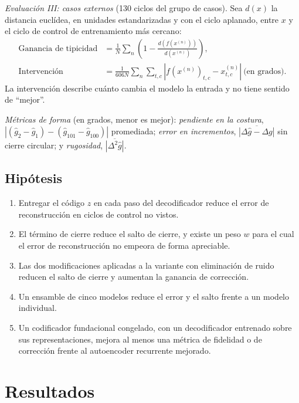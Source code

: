 \documentclass[11pt,a4paper]{amsart}
\begin{document}
\textit{Evaluación III: casos externos} (130 ciclos del grupo de casos). Sea $d(x)$ la distancia euclídea, en unidades estandarizadas y con el ciclo aplanado, entre $x$ y el ciclo de control de entrenamiento más cercano:
\begin{align}
\text{Ganancia de tipicidad}&=\frac1N\sum_{n}\left(1-\frac{d(f(x^{(n)}))}{d(x^{(n)})}\right),\\
\text{Intervención}&=\frac{1}{606N}\sum_{n}\sum_{t,c}\left|f(x^{(n)})_{t,c}-x^{(n)}_{t,c}\right|\ \text{(en grados)}.
\end{align}
La intervención describe cuánto cambia el modelo la entrada y no tiene sentido de ``mejor''.

\textit{Métricas de forma} (en grados, menor es mejor): \emph{pendiente en la costura}, $|(\hat g_2-\hat g_1)-(\hat g_{101}-\hat g_{100})|$ promediada; \emph{error en incrementos}, $\overline{|\Delta\hat g-\Delta g|}$ sin cierre circular; y \emph{rugosidad}, $\overline{|\Delta^2\hat g|}$.

\subsection{Hipótesis}

\begin{enumerate}[label=\textbf{H\arabic*.},leftmargin=2.2em]
\item Entregar el código $z$ en cada paso del decodificador reduce el error de reconstrucción en ciclos de control no vistos.
\item El término de cierre reduce el salto de cierre, y existe un peso $w$ para el cual el error de reconstrucción no empeora de forma apreciable.
\item Las dos modificaciones aplicadas a la variante con eliminación de ruido reducen el salto de cierre y aumentan la ganancia de corrección.
\item Un ensamble de cinco modelos reduce el error y el salto frente a un modelo individual.
\item Un codificador fundacional congelado, con un decodificador entrenado sobre sus representaciones, mejora al menos una métrica de fidelidad o de corrección frente al autoencoder recurrente mejorado.
\end{enumerate}

\section{Resultados}
\label{sec:resultados}
\end{document}
